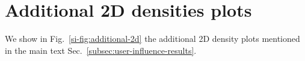 \section{Additional 2D densities plots}
\label{si-sec:polarization-map}

We show in Fig.~\ref{si-fig:additional-2d} the additional 2D density plots mentioned in the main text Sec.~\ref{subsec:user-influence-results}.

%
%
